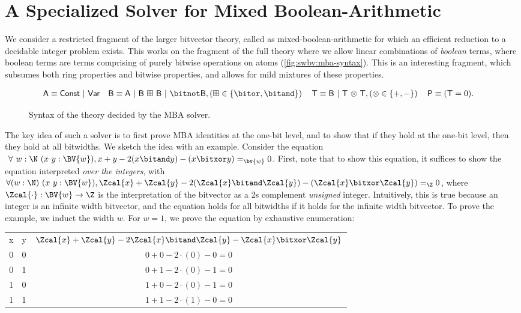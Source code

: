 \section{A Specialized Solver for Mixed Boolean-Arithmetic}
\label{sec:swbv:mba}

We consider a restricted fragment of the larger bitvector theory, called as mixed-boolean-arithmetic \cite{liu2021mba}
for which an efficient reduction to a decidable integer problem exists.
This works on the fragment of the full theory where we allow linear combinations of \emph{boolean} terms,
where boolean terms are terms comprising of purely bitwise operations on atoms (\autoref{fig:swbv:mba-syntax}).
This is an interesting fragment, which subsumes both ring properties and bitwise properties,
and allows for mild mixtures of these properties.

\begin{figure}[htb]
\begin{align*}
&\mathsf{A} \equiv
  \mathsf{Const} ~|~ \mathsf{Var}
\quad \mathsf{B}
  \equiv \mathsf{A} ~|~
  \mathsf{B} ~\mathsf{\boxplus}~ \mathsf{B} ~|~
  \bitnot \mathsf{B}, \left(\boxplus \in \{\bitor, \bitand\}\right)
\quad \mathsf{T}
  \equiv \mathsf{B} ~|~
  \mathsf{T} ~\mathsf{\otimes}~ \mathsf{T}, \left(\otimes \in \{+, - \}\right)
\quad \mathsf{P} \equiv (\mathsf{T} = 0).
\end{align*}
\caption{Syntax of the theory decided by the MBA solver. }
\label{fig:swbv:mba-syntax}
\end{figure}

The key idea of such a solver is to first prove MBA identities at the one-bit level,
and to show that if they hold at the one-bit level, then they hold at all bitwidths.
We sketch the idea with an example.
Consider the equation $~\forall~{w : \N}~(x~y : \BV{w}),x + y - 2 (x \bitand y) - (x \bitxor y) =_{\bv{w}} 0$.
First, note that to show this equation, it suffices to show the equation interpreted \emph{over the integers},
with $\forall (w : \N)~(x~y : \BV{w}), \Zcal{x} + \Zcal{y} - 2 (\Zcal{x} \bitand \Zcal{y}) - (\Zcal{x} \bitxor \Zcal{y}) =_{\Z} 0$,
where $\Zcal{\cdot} : \BV{w} \to \Z$ is the interpretation of the bitvector as a 2s complement \emph{unsigned} integer.
Intuitively, this is true because an integer is an infinite width bitvector,
and the equation holds for all bitwidths if it holds for the infinite width bitvector.
To prove the example, we induct the width $w$.
For $w = 1$, we prove the equation by exhaustive enumeration:

\begin{tabular}{ccc}
\rowcolor{gray!10}
  x & y & $\Zcal{x} + \Zcal{y} - 2 \Zcal{x} \bitand \Zcal{y} - \Zcal{x} \bitxor \Zcal{y}$ \\
  0 & 0 & $0 + 0 - 2 \cdot (0) - 0 = 0$ \\
\rowcolor{gray!10}
  0 & 1 & $0 + 1 - 2 \cdot (0) - 1 = 0$ \\
  1 & 0 & $1 + 0 - 2 \cdot (0) - 1 = 0$ \\
\rowcolor{gray!10}
  1 & 1 & $1 + 1 - 2 \cdot (1) - 0 = 0$
\end{tabular}


